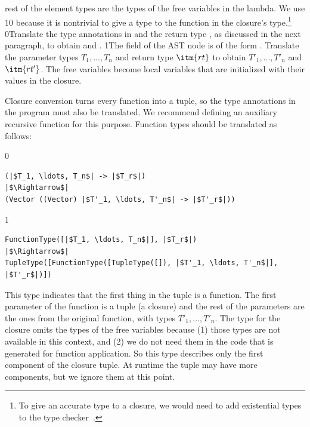 \documentclass[7x10]{TimesAPriori_MIT}%
\def\racketEd{0}
\def\pythonEd{1}
\def\edition{1}
\newcommand{\racket}[1]{{\if\edition\racketEd{#1}\fi}}
\newcommand{\pythonColor}[0]{}
\newcommand{\python}[1]{{\if\edition\pythonEd\pythonColor #1\fi}}
\numberwithin{theorem}{chapter}
\numberwithin{definition}{chapter}
\numberwithin{equation}{chapter}
\begin{document}
rest of the element types are the types of the free variables in the
lambda. We use \python{}\racket{\code{\_}} because it
is nontrivial to give a type to the function in the closure's
type.\footnote{To give an accurate type to a closure, we would need to
  add existential types to the type checker~\citep{Minamide:1996ys}.}
%
\racket{Translate the type
  annotations in  and the return type \itm{rt}, as discussed in
  the next paragraph, to obtain \itm{ps'} and \itm{rt'}.}%
\python{The  field of the  AST node
  is of the form \code{FunctionType([$x_1:T_1,\ldots, x_n:T_n$], $rt$)}.
  Translate the parameter types $T_1,\ldots,T_n$ and return type $\itm{rt}$
  to obtain $T'_1,\ldots, T'_n$ and $\itm{rt'}$.}
The free variables become local variables that are initialized with
their values in the closure.

Closure conversion turns every function into a tuple, so the type
annotations in the program must also be translated.  We recommend
defining an auxiliary recursive function for this purpose.  Function
types should be translated as follows:
%
{\if\edition\racketEd
\begin{lstlisting}
(|$T_1, \ldots, T_n$| -> |$T_r$|)
|$\Rightarrow$|  
(Vector ((Vector) |$T'_1, \ldots, T'_n$| -> |$T'_r$|))
\end{lstlisting}
\fi}
{\if\edition\pythonEd\pythonColor
\begin{lstlisting}
FunctionType([|$T_1, \ldots, T_n$|], |$T_r$|)
|$\Rightarrow$|  
TupleType([FunctionType([TupleType([]), |$T'_1, \ldots, T'_n$|], |$T'_r$|)])
\end{lstlisting}
\fi}
%
This type indicates that the first thing in the tuple is a
function. The first parameter of the function is a tuple (a closure)
and the rest of the parameters are the ones from the original
function, with types $T'_1, \ldots, T'_n$.  The type for the closure
omits the types of the free variables because (1) those types are not
available in this context, and (2) we do not need them in the code that
is generated for function application. So this type describes only the
first component of the closure tuple. At runtime the tuple may have
more components, but we ignore them at this point.
\end{document}
